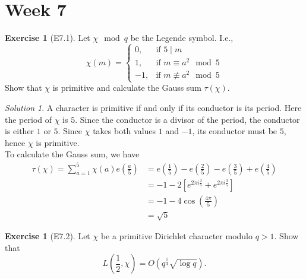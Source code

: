 \documentclass[reqno]{amsart}
\theoremstyle{definition}
\newtheorem{exercise}[theorem]{Exercise}
\theoremstyle{remark}
\newtheorem*{solution}{Solution}
\begin{document}
\section{Week 7}

\begin{exercise}[E7.1]
    Let $\chi \mod q$ be the Legende symbol. I.e.,
     \[
    \chi(m) =
    \begin{cases}
        0, & \text{if } 5  \mid m\\
        1, & \text{if } m \equiv a^2 \mod 5 \\
        -1,& \text{if } m \not \equiv a^2 
        \mod 5
    \end{cases}
    \] 
    Show that $\chi$ is primitive and calculate
    the Gauss sum $\tau(\chi)$.
\end{exercise}

\begin{solution}
    A character is primitive if and only if
    its conductor is its period. Here the
    period of $\chi$ is $5$.
    Since the conductor is a divisor of the period, the
    conductor is either $1$ or $5$. Since
    $\chi$ takes both values $1$ and $-1$, its
    conductor must be $5$, hence $\chi$ is primitive.\\
    To calculate the Gauss sum, we have
    \begin{align*}
    \tau(\chi) =
    \sum_{a=1}^{5} \chi(a) e\left( \frac{a}{5} \right) 
    &= e(\frac{1}{5}) - e(\frac{2}{5}) -
    e\left( \frac{3}{5} \right) +
    e\left( \frac{4}{5} \right) \\
    &= -1 - 2 \left[ e^{2 \pi i \frac{2}{5}}
    + e^{2\pi i \frac{3}{5}}\right] \\
    &= -1 - 4 \cos \left( \frac{4 \pi }{5} \right)\\
    &=\sqrt{5} 
    \end{align*}
\end{solution}

\begin{exercise}[E7.2]
    Let $\chi$ be a primitive Dirichlet character
    modulo $q > 1$. Show that
    \[
    L \left( \frac{1}{2}, \chi \right) =
    O \left( q^{\frac{1}{4}} \sqrt{\log q}  \right) .
    \] 
\end{exercise}
\end{document}
